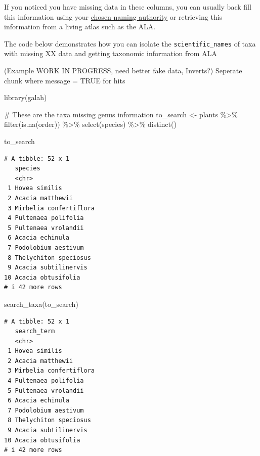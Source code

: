 \documentclass[
  letterpaper,
  DIV=11,
  numbers=noendperiod,
  oneside]{scrreprt}
\newenvironment{Shaded}{\begin{snugshade}}{\end{snugshade}}
\newcommand{\CommentTok}[1]{\textcolor[rgb]{0.37,0.37,0.37}{#1}}
\newcommand{\FunctionTok}[1]{\textcolor[rgb]{0.28,0.35,0.67}{#1}}
\newcommand{\NormalTok}[1]{\textcolor[rgb]{0.00,0.23,0.31}{#1}}
\newcommand{\OtherTok}[1]{\textcolor[rgb]{0.00,0.23,0.31}{#1}}
\newcommand{\SpecialCharTok}[1]{\textcolor[rgb]{0.37,0.37,0.37}{#1}}
\begin{document}
If you noticed you have missing data in these columns, you can usually
back fill this information using your
\href{link\%20back\%20to\%20section}{chosen naming authority} or
retrieving this information from a living atlas such as the ALA.

The code below demonstrates how you can isolate the
\texttt{scientific\_names} of taxa with missing XX data and getting
taxonomic information from ALA

(Example WORK IN PROGRESS, need better fake data, Inverts?) Seperate
chunk where message = TRUE for hits

\begin{Shaded}
\begin{Highlighting}[]
\FunctionTok{library}\NormalTok{(galah)}

\CommentTok{\# These are the taxa missing \textasciigrave{}genus\textasciigrave{} information}
\NormalTok{to\_search }\OtherTok{\textless{}{-}}\NormalTok{ plants }\SpecialCharTok{\%\textgreater{}\%} 
  \FunctionTok{filter}\NormalTok{(}\FunctionTok{is.na}\NormalTok{(order)) }\SpecialCharTok{\%\textgreater{}\%} 
  \FunctionTok{select}\NormalTok{(species) }\SpecialCharTok{\%\textgreater{}\%} 
  \FunctionTok{distinct}\NormalTok{()}

\NormalTok{to\_search}
\end{Highlighting}
\end{Shaded}

\begin{verbatim}
# A tibble: 52 x 1
   species               
   <chr>                 
 1 Hovea similis         
 2 Acacia matthewii      
 3 Mirbelia confertiflora
 4 Pultenaea polifolia   
 5 Pultenaea vrolandii   
 6 Acacia echinula       
 7 Podolobium aestivum   
 8 Thelychiton speciosus 
 9 Acacia subtilinervis  
10 Acacia obtusifolia    
# i 42 more rows
\end{verbatim}

\begin{Shaded}
\begin{Highlighting}[]
\FunctionTok{search\_taxa}\NormalTok{(to\_search)}
\end{Highlighting}
\end{Shaded}

\begin{verbatim}
# A tibble: 52 x 1
   search_term           
   <chr>                 
 1 Hovea similis         
 2 Acacia matthewii      
 3 Mirbelia confertiflora
 4 Pultenaea polifolia   
 5 Pultenaea vrolandii   
 6 Acacia echinula       
 7 Podolobium aestivum   
 8 Thelychiton speciosus 
 9 Acacia subtilinervis  
10 Acacia obtusifolia    
# i 42 more rows
\end{verbatim}
\end{document}
